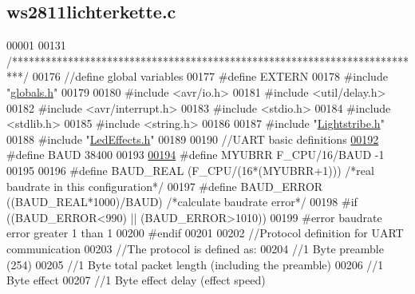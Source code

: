\hypertarget{ws2811lichterkette_8c_source}{}\subsection{ws2811lichterkette.\+c}

\begin{DoxyCode}
00001 
00131 \textcolor{comment}{/**************************************************************************/}
00176 \textcolor{comment}{//define global variables}
00177 \textcolor{preprocessor}{#define EXTERN}
00178 \textcolor{preprocessor}{#include "\hyperlink{globals_8h}{globals.h}"}
00179 
00180 \textcolor{preprocessor}{#include <avr/io.h>}
00181 \textcolor{preprocessor}{#include <util/delay.h>}
00182 \textcolor{preprocessor}{#include <avr/interrupt.h>}
00183 \textcolor{preprocessor}{#include <stdio.h>}      
00184 \textcolor{preprocessor}{#include <stdlib.h>}    
00185 \textcolor{preprocessor}{#include <string.h>}
00186 
00187 \textcolor{preprocessor}{#include "\hyperlink{_lightstribe_8h}{Lightstribe.h}"}
00188 \textcolor{preprocessor}{#include "\hyperlink{_led_effects_8h}{LedEffects.h}"}
00189 
00190 \textcolor{comment}{//UART basic definitions}
\hypertarget{ws2811lichterkette_8c_source_l00192}{}\hyperlink{ws2811lichterkette_8c_a62634036639f88eece6fbf226b45f84b}{00192} \textcolor{comment}{}\textcolor{preprocessor}{#define BAUD 38400  }
00193 
\hypertarget{ws2811lichterkette_8c_source_l00194}{}\hyperlink{ws2811lichterkette_8c_a711e9130c825a7269c8c87dbb57a85e0}{00194} \textcolor{preprocessor}{#define MYUBRR F\_CPU/16/BAUD -1}
00195 
00196 \textcolor{preprocessor}{#define BAUD\_REAL (F\_CPU/(16*(MYUBRR+1)))       }\textcolor{comment}{/*real baudrate in this configuration*/}\textcolor{preprocessor}{}
00197 \textcolor{preprocessor}{#define BAUD\_ERROR ((BAUD\_REAL*1000)/BAUD)      }\textcolor{comment}{/*calculate baudrate error*/}\textcolor{preprocessor}{    }
00198 \textcolor{preprocessor}{#if ((BAUD\_ERROR<990) || (BAUD\_ERROR>1010))}
00199 \textcolor{preprocessor}{    #error baudrate error greater 1%
       than 1%
00200 \textcolor{preprocessor}{#endif}
00201 
00202 \textcolor{comment}{//Protocol definition for UART communication}
00203 \textcolor{comment}{//The protocol is defined as:}
00204 \textcolor{comment}{//1 Byte preamble (254)}
00205 \textcolor{comment}{//1 Byte total packet length (including the preamble)}
00206 \textcolor{comment}{//1 Byte effect}
00207 \textcolor{comment}{//1 Byte effect delay (effect speed)}
}
\end{DoxyCode}
